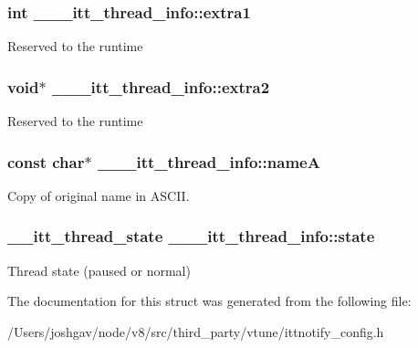 \subsubsection[{\texorpdfstring{extra1}{extra1}}]{\setlength{\rightskip}{0pt plus 5cm}int \+\_\+\+\_\+\+\_\+itt\+\_\+thread\+\_\+info\+::extra1}\hypertarget{struct______itt__thread__info_a24093b12fcbe313abcf61c449d42d66c}{}\label{struct______itt__thread__info_a24093b12fcbe313abcf61c449d42d66c}
Reserved to the runtime 
\subsubsection[{\texorpdfstring{extra2}{extra2}}]{\setlength{\rightskip}{0pt plus 5cm}void$\ast$ \+\_\+\+\_\+\+\_\+itt\+\_\+thread\+\_\+info\+::extra2}\hypertarget{struct______itt__thread__info_a29a043e53a66cc89b62b11f0ad8e7588}{}\label{struct______itt__thread__info_a29a043e53a66cc89b62b11f0ad8e7588}
Reserved to the runtime 
\subsubsection[{\texorpdfstring{nameA}{nameA}}]{\setlength{\rightskip}{0pt plus 5cm}const char$\ast$ \+\_\+\+\_\+\+\_\+itt\+\_\+thread\+\_\+info\+::nameA}\hypertarget{struct______itt__thread__info_af0d071b9ab2b86c040a6de800f92cb30}{}\label{struct______itt__thread__info_af0d071b9ab2b86c040a6de800f92cb30}
Copy of original name in A\+S\+C\+II. 
\subsubsection[{\texorpdfstring{state}{state}}]{\setlength{\rightskip}{0pt plus 5cm}\+\_\+\+\_\+itt\+\_\+thread\+\_\+state \+\_\+\+\_\+\+\_\+itt\+\_\+thread\+\_\+info\+::state}\hypertarget{struct______itt__thread__info_a6f6f3ed5a462461cc8dc05b650e331ba}{}\label{struct______itt__thread__info_a6f6f3ed5a462461cc8dc05b650e331ba}
Thread state (paused or normal) 

The documentation for this struct was generated from the following file\+:\begin{DoxyCompactItemize}
\item 
/\+Users/joshgav/node/v8/src/third\+\_\+party/vtune/ittnotify\+\_\+config.\+h\end{DoxyCompactItemize}
